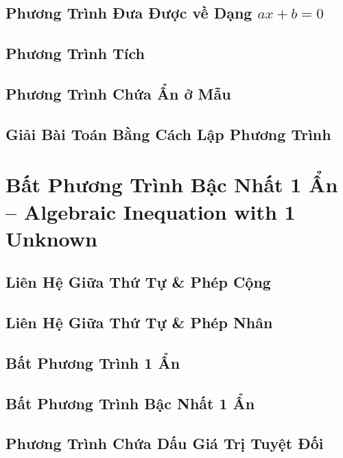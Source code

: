 \documentclass[oneside]{book}
\numberwithin{equation}{section}
\begin{document}
\section{Phương Trình Đưa Được về Dạng $ax + b = 0$}

\section{Phương Trình Tích}

\section{Phương Trình Chứa Ẩn ở Mẫu}

\section{Giải Bài Toán Bằng Cách Lập Phương Trình}


\chapter{Bất Phương Trình Bậc Nhất 1 Ẩn -- Algebraic Inequation with 1 Unknown}

\section{Liên Hệ Giữa Thứ Tự \& Phép Cộng}

\section{Liên Hệ Giữa Thứ Tự \& Phép Nhân}

\section{Bất Phương Trình 1 Ẩn}

\section{Bất Phương Trình Bậc Nhất 1 Ẩn}

\section{Phương Trình Chứa Dấu Giá Trị Tuyệt Đối}

\end{document}
